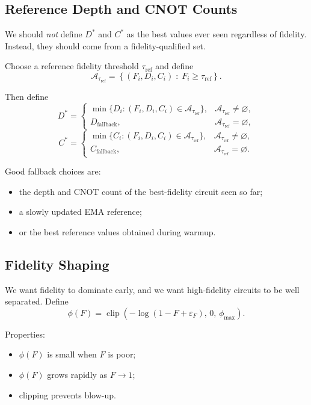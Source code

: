 \documentclass[11pt]{article}
\begin{document}
\subsection{Reference Depth and CNOT Counts}

We should \emph{not} define $D^*$ and $C^*$ as the best values ever seen regardless of fidelity.
Instead, they should come from a fidelity-qualified set.

Choose a reference fidelity threshold $\tau_{\mathrm{ref}}$ and define
\[
\mathcal{A}_{\tau_{\mathrm{ref}}}
=
\left\{
(F_i,D_i,C_i)
\;:\;
F_i \ge \tau_{\mathrm{ref}}
\right\}.
\]

Then define
\[
D^*
=
\begin{cases}
\min\{D_i : (F_i,D_i,C_i)\in \mathcal{A}_{\tau_{\mathrm{ref}}}\}, & \mathcal{A}_{\tau_{\mathrm{ref}}}\neq\varnothing,\\[6pt]
D_{\mathrm{fallback}}, & \mathcal{A}_{\tau_{\mathrm{ref}}}=\varnothing,
\end{cases}
\]
\[
C^*
=
\begin{cases}
\min\{C_i : (F_i,D_i,C_i)\in \mathcal{A}_{\tau_{\mathrm{ref}}}\}, & \mathcal{A}_{\tau_{\mathrm{ref}}}\neq\varnothing,\\[6pt]
C_{\mathrm{fallback}}, & \mathcal{A}_{\tau_{\mathrm{ref}}}=\varnothing.
\end{cases}
\]

Good fallback choices are:

\begin{itemize}[leftmargin=*]
\item the depth and CNOT count of the best-fidelity circuit seen so far;
\item a slowly updated EMA reference;
\item or the best reference values obtained during warmup.
\end{itemize}

\subsection{Fidelity Shaping}

We want fidelity to dominate early, and we want high-fidelity circuits to be well separated.
Define
\[
\phi(F)
=
\operatorname{clip}\!\left(
-\log(1-F+\varepsilon_F),
\,
0,
\,
\phi_{\max}
\right).
\]

Properties:

\begin{itemize}[leftmargin=*]
\item $\phi(F)$ is small when $F$ is poor;
\item $\phi(F)$ grows rapidly as $F \to 1$;
\item clipping prevents blow-up.
\end{itemize}
\end{document}
